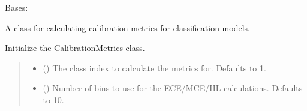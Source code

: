 \documentclass[letterpaper,10pt,english]{sphinxmanual}
\begin{document}
\begin{fulllineitems}
\label{\detokenize{calzone:calzone.metrics.CalibrationMetrics}}
\pysigstartsignatures
{}
\pysigstopsignatures
\sphinxAtStartPar
Bases: 

\sphinxAtStartPar
A class for calculating calibration metrics for classification models.

\begin{fulllineitems}
\label{\detokenize{calzone:calzone.metrics.CalibrationMetrics.__init__}}
\pysigstartsignatures
{}
\pysigstopsignatures
\sphinxAtStartPar
Initialize the CalibrationMetrics class.
\begin{quote}\begin{description}
\begin{itemize}
\item {} 
\sphinxAtStartPar
{} (\sphinxstyleliteralemphasis{\sphinxupquote{, }}) \textendash{} The class index to calculate the metrics for. Defaults to 1.

\item {} 
\sphinxAtStartPar
{} (\sphinxstyleliteralemphasis{\sphinxupquote{, }}) \textendash{} Number of bins to use for the ECE/MCE/HL calculations. Defaults to 10.

\end{itemize}

\end{description}\end{quote}


\end{fulllineitems}
\end{fulllineitems}
\end{document}
